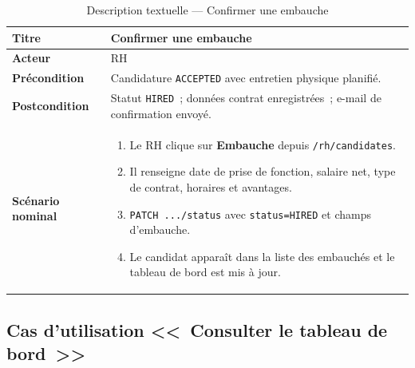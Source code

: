 \begin{table}[htbp]
  \centering
  \small
  \caption{Description textuelle --- Confirmer une embauche}
  \label{tab:uc-hire}
  \begin{tabular}{|p{3.0cm}|p{10.2cm}|}
    \hline
    \textbf{Titre} & Confirmer une embauche \\
    \hline
    \textbf{Acteur} & RH \\
    \hline
    \textbf{Précondition} & Candidature \texttt{ACCEPTED} avec entretien physique planifié. \\
    \hline
    \textbf{Postcondition} & Statut \texttt{HIRED}~; données contrat enregistrées~;
          e-mail de confirmation envoyé. \\
    \hline
    \textbf{Scénario nominal}
    &
    \begin{enumerate}[leftmargin=*,itemsep=0.15em,topsep=0.2em]
      \item Le RH clique sur \textbf{Embauche} depuis \texttt{/rh/candidates}.
      \item Il renseigne date de prise de fonction, salaire net, type de contrat,
            horaires et avantages.
      \item \texttt{PATCH .../status} avec \texttt{status=HIRED} et champs d'embauche.
      \item Le candidat apparaît dans la liste des embauchés et le tableau de bord
            est mis à jour.
    \end{enumerate}
    \\
    \hline
  \end{tabular}
\end{table}


\subsection{Cas d'utilisation <<~Consulter le tableau de bord~>>}

